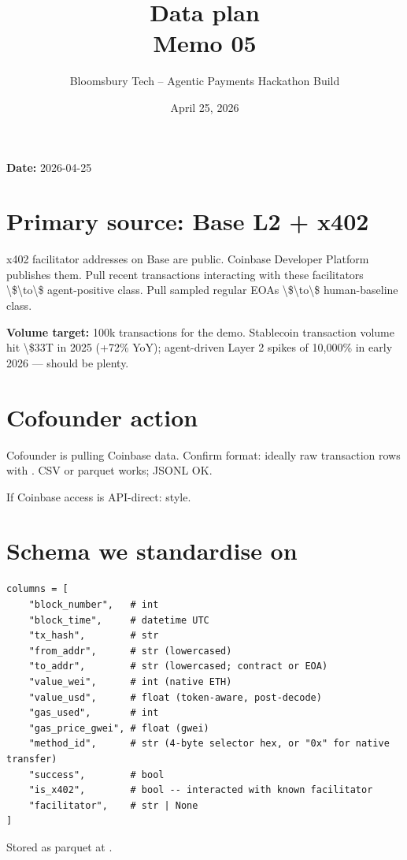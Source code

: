 \documentclass[11pt]{article}
\title{\textbf{Data plan}\\
\large Memo 05}
\author{Bloomsbury Tech -- Agentic Payments Hackathon Build}
\date{April 25, 2026}
\begin{document}
\maketitle

\textbf{Date:} 2026-04-25

\section{Primary source: Base L2 + x402}
x402 facilitator addresses on Base are public. Coinbase Developer Platform publishes them. Pull recent transactions interacting with these facilitators \textbackslash{}\$\textbackslash{}to\textbackslash{}\$ agent-positive class. Pull sampled regular EOAs \textbackslash{}\$\textbackslash{}to\textbackslash{}\$ human-baseline class.

\textbf{Volume target:} 100k transactions for the demo. Stablecoin transaction volume hit \textbackslash{}\$33T in 2025 (+72\% YoY); agent-driven Layer 2 spikes of 10,000\% in early 2026 --- should be plenty.

\section{Cofounder action}
Cofounder is pulling Coinbase data. Confirm format: ideally raw transaction rows with . CSV or parquet works; JSONL OK.

If Coinbase access is API-direct:  style.

\section{Schema we standardise on}
\begin{lstlisting}
columns = [
    "block_number",   # int
    "block_time",     # datetime UTC
    "tx_hash",        # str
    "from_addr",      # str (lowercased)
    "to_addr",        # str (lowercased; contract or EOA)
    "value_wei",      # int (native ETH)
    "value_usd",      # float (token-aware, post-decode)
    "gas_used",       # int
    "gas_price_gwei", # float (gwei)
    "method_id",      # str (4-byte selector hex, or "0x" for native transfer)
    "success",        # bool
    "is_x402",        # bool -- interacted with known facilitator
    "facilitator",    # str | None
]
\end{lstlisting}
Stored as parquet at .
\end{document}
